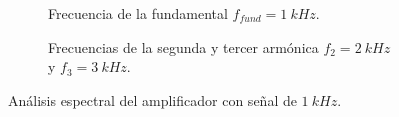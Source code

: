       \begin{figure}[H]
        \centering
        \begin{subfigure}[H]{0.48\textwidth}
          \caption{Frecuencia de la fundamental $f_{fund}=1~kHz$.}
          \label{fig:Exp7FrecFundamental}
        \end{subfigure}
        \hfill 
        \begin{subfigure}[H]{0.48\textwidth}
          \caption{Frecuencias de la segunda y tercer armónica $f_{2}=2~kHz$ y $f_{3}=3~kHz$.}
          \label{fig:Exp7Frec2da3raArmo}
        \end{subfigure}     
        \caption{Análisis espectral del amplificador con señal de $1~kHz$.}
        \label{fig:Exp7FrecFundYArmonicas}
      \end{figure}

